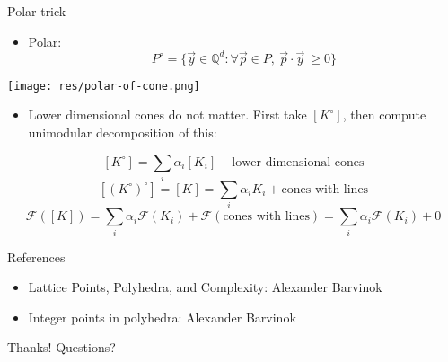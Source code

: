 \documentclass[8pt]{beamer}
\begin{document}
\begin{frame}[label=sec-16]{Polar trick}
\begin{itemize}
\item Polar: $$P^\circ = \Bigg\{ \vec y \in \mathbb{Q}^d :  \forall \vec p \in P, \  \vec p \cdot \vec y  \ \geq 0 \Bigg\}$$
\end{itemize}

\begin{center}
\texttt{[image: res/polar-of-cone.png]}
\end{center}

\begin{itemize}
\item Lower dimensional cones do not matter. First take $[K^\circ]$, then compute unimodular decomposition of this:
\end{itemize}
$$[K^\circ] = \sum_i \alpha_i [K_i] + \text{lower dimensional cones}$$
$$[(K^\circ)^\circ] = [K] = \sum_i \alpha_i K_i + \text{cones with lines}$$
$$ \mathcal{F}([K]) = \sum_i \alpha_i \mathcal{F}(K_i) + \mathcal{F}(\text{cones with lines}) = \sum_i \alpha_i \mathcal{F}(K_i) + 0$$
\end{frame}



\begin{frame}[label=sec-17]{References}
\begin{itemize}
\item Lattice Points, Polyhedra, and Complexity: Alexander Barvinok
\item Integer points in polyhedra: Alexander Barvinok
\end{itemize}
\end{frame}


\begin{frame}[label=sec-18]{Thanks!}
Questions?
\end{frame}
\end{document}
